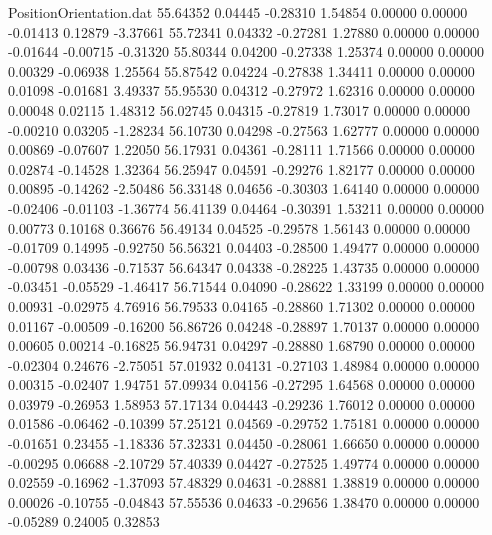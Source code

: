 \begin{filecontents}{PositionOrientation.dat}
  55.64352    0.04445   -0.28310     1.54854    0.00000    0.00000   -0.01413    0.12879   -3.37661
  55.72341    0.04332   -0.27281     1.27880    0.00000    0.00000   -0.01644   -0.00715   -0.31320
  55.80344    0.04200   -0.27338     1.25374    0.00000    0.00000    0.00329   -0.06938    1.25564
  55.87542    0.04224   -0.27838     1.34411    0.00000    0.00000    0.01098   -0.01681    3.49337
  55.95530    0.04312   -0.27972     1.62316    0.00000    0.00000    0.00048    0.02115    1.48312
  56.02745    0.04315   -0.27819     1.73017    0.00000    0.00000   -0.00210    0.03205   -1.28234
  56.10730    0.04298   -0.27563     1.62777    0.00000    0.00000    0.00869   -0.07607    1.22050
  56.17931    0.04361   -0.28111     1.71566    0.00000    0.00000    0.02874   -0.14528    1.32364
  56.25947    0.04591   -0.29276     1.82177    0.00000    0.00000    0.00895   -0.14262   -2.50486
  56.33148    0.04656   -0.30303     1.64140    0.00000    0.00000   -0.02406   -0.01103   -1.36774
  56.41139    0.04464   -0.30391     1.53211    0.00000    0.00000    0.00773    0.10168    0.36676
  56.49134    0.04525   -0.29578     1.56143    0.00000    0.00000   -0.01709    0.14995   -0.92750
  56.56321    0.04403   -0.28500     1.49477    0.00000    0.00000   -0.00798    0.03436   -0.71537
  56.64347    0.04338   -0.28225     1.43735    0.00000    0.00000   -0.03451   -0.05529   -1.46417
  56.71544    0.04090   -0.28622     1.33199    0.00000    0.00000    0.00931   -0.02975    4.76916
  56.79533    0.04165   -0.28860     1.71302    0.00000    0.00000    0.01167   -0.00509   -0.16200
  56.86726    0.04248   -0.28897     1.70137    0.00000    0.00000    0.00605    0.00214   -0.16825
  56.94731    0.04297   -0.28880     1.68790    0.00000    0.00000   -0.02304    0.24676   -2.75051
  57.01932    0.04131   -0.27103     1.48984    0.00000    0.00000    0.00315   -0.02407    1.94751
  57.09934    0.04156   -0.27295     1.64568    0.00000    0.00000    0.03979   -0.26953    1.58953
  57.17134    0.04443   -0.29236     1.76012    0.00000    0.00000    0.01586   -0.06462   -0.10399
  57.25121    0.04569   -0.29752     1.75181    0.00000    0.00000   -0.01651    0.23455   -1.18336
  57.32331    0.04450   -0.28061     1.66650    0.00000    0.00000   -0.00295    0.06688   -2.10729
  57.40339    0.04427   -0.27525     1.49774    0.00000    0.00000    0.02559   -0.16962   -1.37093
  57.48329    0.04631   -0.28881     1.38819    0.00000    0.00000    0.00026   -0.10755   -0.04843
  57.55536    0.04633   -0.29656     1.38470    0.00000    0.00000   -0.05289    0.24005    0.32853

\end{filecontents}
